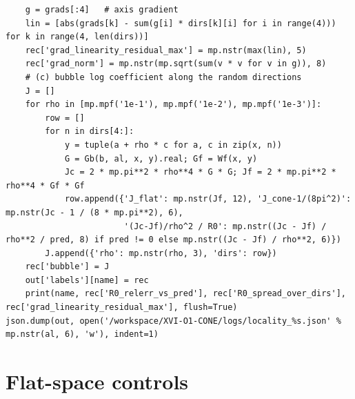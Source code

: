 \documentclass[10pt]{article}
\begin{document}
\begin{lstlisting}
    g = grads[:4]   # axis gradient
    lin = [abs(grads[k] - sum(g[i] * dirs[k][i] for i in range(4))) for k in range(4, len(dirs))]
    rec['grad_linearity_residual_max'] = mp.nstr(max(lin), 5)
    rec['grad_norm'] = mp.nstr(mp.sqrt(sum(v * v for v in g)), 8)
    # (c) bubble log coefficient along the random directions
    J = []
    for rho in [mp.mpf('1e-1'), mp.mpf('1e-2'), mp.mpf('1e-3')]:
        row = []
        for n in dirs[4:]:
            y = tuple(a + rho * c for a, c in zip(x, n))
            G = Gb(b, al, x, y).real; Gf = Wf(x, y)
            Jc = 2 * mp.pi**2 * rho**4 * G * G; Jf = 2 * mp.pi**2 * rho**4 * Gf * Gf
            row.append({'J_flat': mp.nstr(Jf, 12), 'J_cone-1/(8pi^2)': mp.nstr(Jc - 1 / (8 * mp.pi**2), 6),
                        '(Jc-Jf)/rho^2 / R0': mp.nstr((Jc - Jf) / rho**2 / pred, 8) if pred != 0 else mp.nstr((Jc - Jf) / rho**2, 6)})
        J.append({'rho': mp.nstr(rho, 3), 'dirs': row})
    rec['bubble'] = J
    out['labels'][name] = rec
    print(name, rec['R0_relerr_vs_pred'], rec['R0_spread_over_dirs'], rec['grad_linearity_residual_max'], flush=True)
json.dump(out, open('/workspace/XVI-O1-CONE/logs/locality_%s.json' % mp.nstr(al, 6), 'w'), indent=1)
\end{lstlisting}
\section{Flat-space controls}
\end{document}
